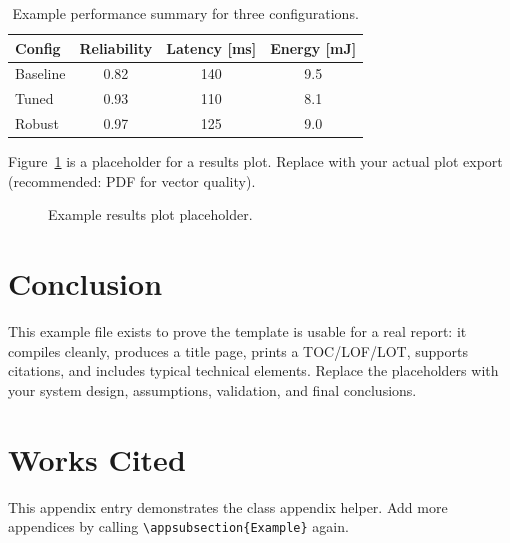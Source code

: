 \documentclass[
    left=1.5in,
    right=1.25in,
    top=1.25in,
    bottom=1.25in
]{CalPolySeniorProject}
\begin{document}
\begin{table}[!ht]
    \centering
    \caption[Example results table]{Example performance summary for three
    configurations.}
    \vspace{0.5\baselineskip}
    \begin{tabular}{lccc}
        \toprule
        \textbf{Config} &
        \textbf{Reliability} &
        \textbf{Latency [ms]} &
        \textbf{Energy [mJ]} \\
        \midrule
        Baseline & 0.82 & 140 & 9.5 \\
        Tuned    & 0.93 & 110 & 8.1 \\
        Robust   & 0.97 & 125 & 9.0 \\
        \bottomrule
    \end{tabular}
    \label{tab:results}
\end{table}

Figure~\ref{fig:trend} is a placeholder for a results plot. Replace with your
actual plot export (recommended: PDF for vector quality).

\begin{figure}[!ht]
    \centering
    \caption[Results plot placeholder]{Example results plot placeholder.}
    \label{fig:trend}
\end{figure}

\section{Conclusion}

This example file exists to prove the template is usable for a real report: it
compiles cleanly, produces a title page, prints a TOC/LOF/LOT, supports
citations, and includes typical technical elements. Replace the placeholders
with your system design, assumptions, validation, and final conclusions.

\clearpage
\section{Works Cited}
\printbibliography[heading=none]

\beginappendices


This appendix entry demonstrates the class appendix helper. Add more appendices
by calling \verb|\appsubsection{Example}| again.
\end{document}
